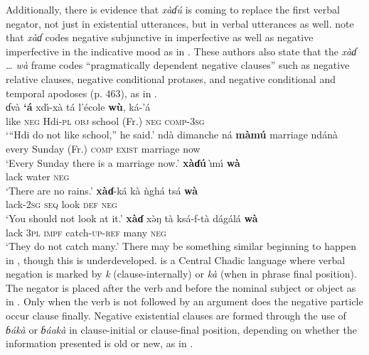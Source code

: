 \documentclass[output=paper]{langsci/langscibook}
\begin{document}
Additionally, there is evidence that \textit{x\`aɗ\'u} is coming to replace
the first verbal negator, not just in existential utterances, but in verbal
utterances as well. \citet{FrajzyngierShay2002} note that \textit{x\`aɗ} codes negative subjunctive in
imperfective as well as negative imperfective in the indicative mood as in
.  These authors also state that the \textit{x\`aɗ
\ldots{} w\`a} frame codes ``pragmatically dependent negative clauses''
such as negative relative clauses, negative conditional protases, and
negative conditional and temporal apodoses (p. 463), as in
.  \ea\label{ex:hdi-school-marriage-rain-look-catch}
\\
\ea\label{ex:hdi-school} \gll ɗv\`a \textbf{`\'a} xd\'\i-x\`a t\'a
l'\'ecole \textbf{w\`u}, k\'a-'\'a\\ like \textsc{neg} Hdi-\textsc{pl}
\textsc{obj} {school (Fr.)} \textsc{neg} \textsc{comp-3sg}\\ \glt `{}``Hdi
do not like school,'' he said.' 
\ex\label{ex:hdi-marriage} \gll {\'\i}nd\`a
dimanche n\'a \textbf{m\`am\'u} marriage nd\'an\`a\\ every {Sunday (Fr.)}
\textsc{comp} \textsc{exist} marriage now\\ \glt `Every Sunday there is a
marriage now.' 
\ex\label{ex:hdi-rain} \gll \textbf{x\`aɗ\'u} {\`\i}m\'\i{}
\textbf{w\`a}\\ lack water \textsc{neg}\\ \glt `There are no rains.'
\ex\label{ex:hdi-look} \gll \textbf{x\`aɗ}-k\'a k\`a \`ngh\'a ts\'a
\textbf{w\`a}\\ lack-2\textsc{sg} \textsc{seq} look \textsc{def}
\textsc{neg}\\ \glt `You should not look at it.' \ex\label{ex:hdi-catch}
\gll \textbf{x\`aɗ} x\`əŋ t\`a ks\'a-f-t\`a d\'ag\'al\'a \textbf{w\`a}\\
lack 3\textsc{pl} \textsc{impf} catch-\textsc{up-ref} many \textsc{neg}\\
\glt `They do not catch many.' \z\z There may be something similar
beginning to happen in , though this is underdeveloped.
 is a Central Chadic language where verbal negation is marked
by \textit{k} (clause-internally) or \textit{k\`a} (when in phrase final
position). The negator is placed after the verb and before the nominal
subject or object as in . Only when the verb is not
followed by an argument does the negative particle occur clause finally.
Negative existential clauses are formed through the use of
\textit{ɓ\'ak\`a} or \textit{ɓ\'aak\`a} in clause-initial or clause-final
position, depending on whether the information presented is old or new, as
in . 
  
\end{document}
